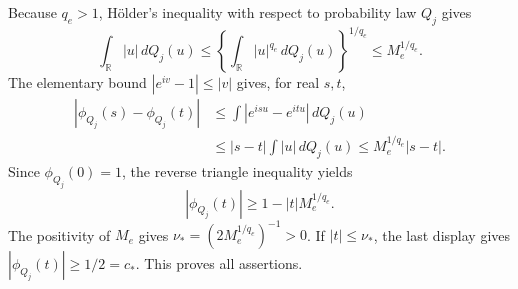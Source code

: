 Because \(q_e>1\), H\"older's inequality with respect to probability law \(Q_j\) gives
\[
 \int_{\mathbb R}|u|\,dQ_j(u)
 \le\left\{\int_{\mathbb R}|u|^{q_e}\,dQ_j(u)\right\}^{1/q_e}
 \le M_e^{1/q_e}.
\]
The elementary bound \(|e^{iv}-1|\le|v|\) gives, for real \(s,t\),
\[
 \begin{aligned}
 |\phi_{Q_j}(s)-\phi_{Q_j}(t)|
 &\le\int|e^{isu}-e^{itu}|\,dQ_j(u)\\
 &\le|s-t|\int|u|\,dQ_j(u)
 \le M_e^{1/q_e}|s-t|.
 \end{aligned}
\]
Since \(\phi_{Q_j}(0)=1\), the reverse triangle inequality yields
\[
 |\phi_{Q_j}(t)|\ge1-|t|M_e^{1/q_e}.
\]
The positivity of \(M_e\) gives \(\nu_*=(2M_e^{1/q_e})^{-1}>0\). If \(|t|\le\nu_*\), the last display gives \(|\phi_{Q_j}(t)|\ge1/2=c_*\). This proves all assertions.
